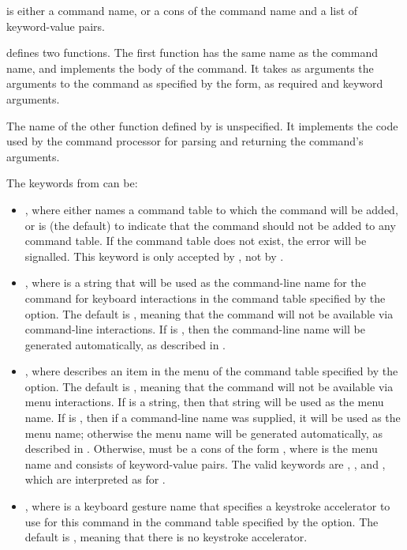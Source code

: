  is either a command name, or a cons of the command name
and a list of keyword-value pairs.

 defines two functions.  The first function has the same name
as the command name, and implements the body of the command.  It takes as
arguments the arguments to the command as specified by the 
form, as required and keyword arguments.

The name of the other function defined by  is unspecified.
It implements the code used by the command processor for parsing and returning
the command's arguments.

The keywords from  can be:

\begin{itemize}
\item {} , where
 either names a command table to which the command will
be added, or is  (the default) to indicate that the command should not
be added to any command table.  If the command table does not exist, the
 error will be signalled.  This keyword is only
accepted by , not by \DefineFrameCommand.

\item {} , where  is a string that will be used
as the command-line name for the command for keyboard interactions in the
command table specified by the  option.  The default is
, meaning that the command will not be available via command-line
interactions.  If  is , then the command-line name will be
generated automatically, as described in .

\item {} , where  describes an item in the
menu of the command table specified by the  option.  The
default is , meaning that the command will not be available via menu
interactions.  If  is a string, then that string will be used as
the menu name.  If  is , then if a command-line name was
supplied, it will be used as the menu name; otherwise the menu name will be
generated automatically, as described in .
Otherwise,  must be a cons of the form , where  is the menu name and 
consists of keyword-value pairs.  The valid keywords are ,
, and , which are interpreted as for
.

\item {} , where  is a keyboard gesture
name that specifies a keystroke accelerator to use for this command in the
command table specified by the  option.  The default is
, meaning that there is no keystroke accelerator.
\end{itemize}

